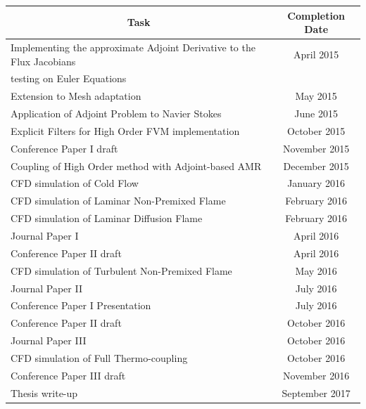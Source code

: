 \documentclass[titlepage,11pt,letterpaper]{article}
\begin{document}
\begin{tabular}{|l|c|} \hline
\multicolumn{1}{|c|}{\bf{Task}} & \multicolumn{1}{|c|}{\bf{Completion Date}} \\

\hline Implementing the approximate Adjoint Derivative to the Flux Jacobians & April 2015 \\ testing on Euler Equations  &\\

\hline Extension to Mesh adaptation & May 2015\\

\hline Application of Adjoint Problem to Navier Stokes  & June 2015\\

\hline Explicit Filters for High Order FVM implementation  & October 2015\\

\hline Conference Paper I draft & November 2015\\

\hline Coupling of High Order method with Adjoint-based AMR & December 2015\\

\hline CFD simulation of Cold Flow & January 2016\\

\hline CFD simulation of Laminar Non-Premixed Flame & February 2016\\

\hline CFD simulation of Laminar Diffusion Flame & February 2016\\

\hline Journal Paper I & April 2016\\

\hline Conference Paper II draft & April 2016\\

\hline CFD simulation of Turbulent Non-Premixed Flame & May 2016\\

\hline Journal Paper II & July 2016\\

\hline Conference Paper I Presentation  & July 2016\\

\hline Conference Paper II draft  & October 2016\\

\hline Journal Paper III & October 2016\\

\hline CFD simulation of Full Thermo-coupling & October 2016\\

\hline Conference Paper III draft  & November 2016\\

\hline Thesis write-up & September 2017 \\ 

\hline

\end{tabular}

 
\end{document}
